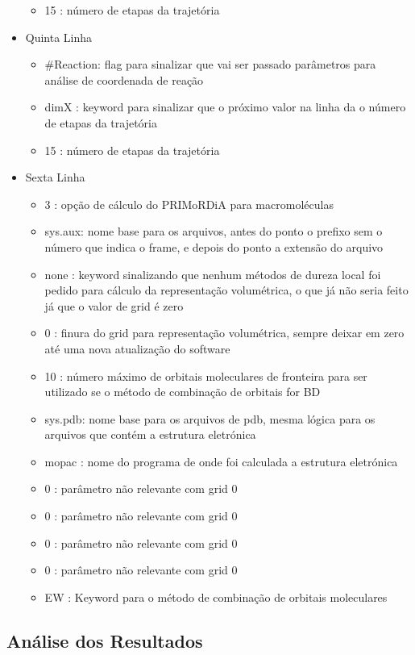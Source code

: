 \documentclass[a4paper,11pt]{refart}
\begin{document}
\begin{itemize}
\begin{itemize}
	\item 15       : número de etapas da trajetória
	\end{itemize}
	\item Quinta Linha 
	\begin{itemize}
	\item \#Reaction: flag para sinalizar que vai ser passado parâmetros para análise de coordenada de reação
	\item dimX      : keyword para sinalizar que o próximo valor na linha da o número de etapas da trajetória
	\item 15        : número de etapas da trajetória
	\end{itemize}
	\item Sexta Linha 
	\begin{itemize}
	\item 3      : opção de cálculo do PRIMoRDiA para macromoléculas
	\item sys.aux: nome base para os arquivos, antes do ponto o prefixo sem o número que indica o frame, e depois do ponto a extensão do arquivo
	\item none   : keyword sinalizando que nenhum métodos de dureza local foi pedido para cálculo da representação volumétrica, o que já não seria feito já que o valor de grid é zero
	\item 0      : finura do grid para representação volumétrica, sempre deixar em zero até uma nova atualização do software
	\item 10     : número máximo de orbitais moleculares de fronteira para ser utilizado se o método de combinação de orbitais for BD
	\item sys.pdb: nome base para os arquivos de pdb, mesma lógica para os arquivos que contém a estrutura eletrónica
	\item mopac  : nome do programa de onde foi calculada a estrutura eletrónica
	\item 0      : parâmetro não relevante com grid 0
	\item 0      : parâmetro não relevante com grid 0
	\item 0      : parâmetro não relevante com grid 0
	\item 0      : parâmetro não relevante com grid 0
	\item EW     : Keyword para o método de combinação de orbitais moleculares
	\end{itemize}
\end{itemize}

\subsection{Análise dos Resultados}
\end{document}
